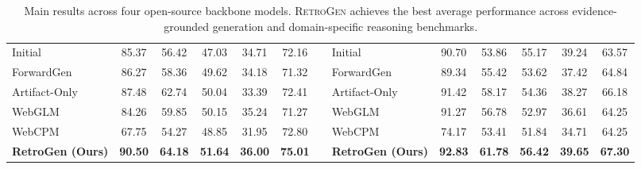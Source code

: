 \begin{table}[!t]
{\begin{tabular}{
lccccc
@{\hspace{0.6em}} c @{\hspace{0.6em}}
lccccc
}
\midrule

Initial & 85.37 & 56.42 & 47.03 & 34.71 & 72.16
&
&
Initial & 90.70 & 53.86 & 55.17 & 39.24 & 63.57 \\

ForwardGen & 86.27 & 58.36 & 49.62 & 34.18 & 71.32
&
&
ForwardGen & 89.34 & 55.42 & 53.62 & 37.42 & 64.84 \\

Artifact-Only & 87.48 & 62.74 & 50.04 & 33.39 & 72.41
&
&
Artifact-Only & 91.42& 58.17 & 54.36 & 38.27 & 66.18 \\

WebGLM & 84.26 & 59.85 & 50.15 & 35.24 & 71.27 
&
&
WebGLM & 91.27 & 56.78 & 52.97 & 36.61 & 64.25\\

WebCPM & 67.75 & 54.27 & 48.85 & 31.95 & 72.80
&
&
WebCPM & 74.17 & 53.41 & 51.84 & 34.71 & 64.25 \\

\textbf{RetroGen (Ours)} & \textbf{90.50} & \textbf{64.18} & \textbf{51.64} & \textbf{36.00} & \textbf{75.01}
&
&
\textbf{RetroGen (Ours)} & \textbf{92.83} & \textbf{61.78} & \textbf{56.42} & \textbf{39.65} & \textbf{67.30} \\

\bottomrule
\end{tabular}
}
\caption{Main results across four open-source backbone models. 
\textsc{RetroGen} achieves the best average performance across evidence-grounded generation and domain-specific reasoning benchmarks.}
\label{tab:main_results}
\end{table}